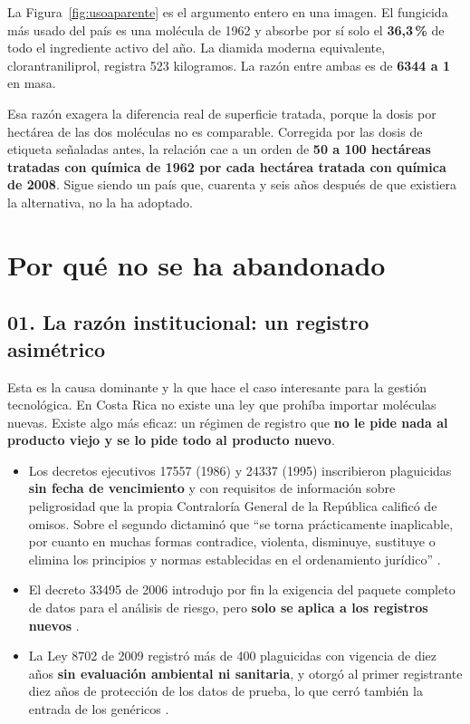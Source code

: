 \documentclass[11pt,letterpaper]{article}
\begin{document}
La Figura~\ref{fig:usoaparente} es el argumento entero en una imagen. El
fungicida más usado del país es una molécula de 1962 y absorbe por sí solo el
\textbf{36,3\,\%} de todo el ingrediente activo del año. La diamida moderna
equivalente, clorantraniliprol, registra 523 kilogramos. La razón entre ambas es
de \textbf{\num{6344} a 1} en masa.

Esa razón exagera la diferencia real de superficie tratada, porque la dosis por
hectárea de las dos moléculas no es comparable. Corregida por las dosis de
etiqueta señaladas antes, la relación cae a un orden de \textbf{50 a 100
hectáreas tratadas con química de 1962 por cada hectárea tratada con química de
2008}. Sigue siendo un país que, cuarenta y seis años después de que existiera
la alternativa, no la ha adoptado.

\section{Por qué no se ha abandonado}

\subsection*{01. La razón institucional: un registro asimétrico}

Esta es la causa dominante y la que hace el caso interesante para la gestión
tecnológica. En Costa Rica no existe una ley que prohíba importar moléculas
nuevas. Existe algo más eficaz: un régimen de registro que \textbf{no le pide
nada al producto viejo y se lo pide todo al producto nuevo}.

\begin{itemize}
  \item Los decretos ejecutivos 17557 (1986) y 24337 (1995) inscribieron
    plaguicidas \textbf{sin fecha de vencimiento} y con requisitos de información
    sobre peligrosidad que la propia Contraloría General de la República calificó
    de omisos. Sobre el segundo dictaminó que \enquote{se torna prácticamente
    inaplicable, por cuanto en muchas formas contradice, violenta, disminuye,
    sustituye o elimina los principios y normas establecidas en el ordenamiento
    jurídico} \parencite[citado en][]{vargas2021}.
  \item El decreto 33495 de 2006 introdujo por fin la exigencia del paquete
    completo de datos para el análisis de riesgo, pero \textbf{solo se aplica a
    los registros nuevos} \parencite{decreto33495}.
  \item La Ley 8702 de 2009 registró más de 400 plaguicidas con vigencia de diez
    años \textbf{sin evaluación ambiental ni sanitaria}, y otorgó al primer
    registrante diez años de protección de los datos de prueba, lo que cerró
    también la entrada de los genéricos \parencite{ley8702,vargas2021}.
\end{itemize}
\end{document}
